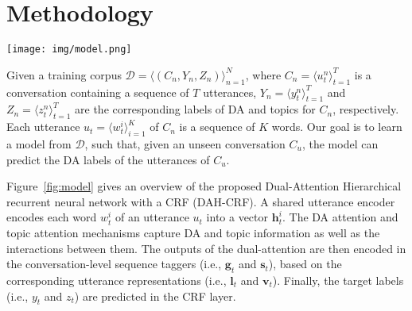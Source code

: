 \documentclass[11pt,a4paper]{article}
\begin{document}
\section{Methodology}




\begin{figure*}[t]
  \centering
  \texttt{[image: img/model.png]}
  \caption{Overview of the dual-attention hierarchical recurrent neural network with a CRF.}
  \label{fig:model}
\end{figure*}

Given a training corpus $\mathcal{D}=\langle(C_n, Y_n, Z_n)\rangle_{n=1}^N$, where $C_n = \langle u_{t}^n \rangle_{t=1}^T$ is a conversation containing a sequence of $T$ utterances, $Y_n = \langle y_{t}^n \rangle_{t=1}^T$ and $Z_n = \langle z_{t}^n \rangle_{t=1}^T$ are the corresponding labels of DA and topics for $C_n$, respectively. Each utterance $u_{t} = \langle w_t^i \rangle_{i=1}^K$ of $C_n$ is a sequence of $K$ words. Our goal is to learn a model from $\mathcal{D}$, such that, given an unseen conversation $C_u$, the model can predict the DA labels 
of the utterances of $C_u$. 


Figure~\ref{fig:model} gives an overview of the proposed Dual-Attention Hierarchical recurrent neural network with a CRF (DAH-CRF). 
A shared utterance encoder encodes each word $w_t^i$ of an utterance $u_t$ into a vector $\mathbf{h}_t^i$.
The DA attention and topic attention mechanisms capture DA and topic information as well as the interactions between them. 
The outputs of the dual-attention are then encoded in the conversation-level sequence taggers (i.e., $\mathbf{g} _t$ and $\mathbf{s}_t$), based on the corresponding utterance representations (i.e., $\mathbf{l} _t$ and $\mathbf{v}_t$). Finally, the target labels (i.e., $y _{t}$ and $z_{t}$) are predicted in the CRF layer. 
\end{document}

